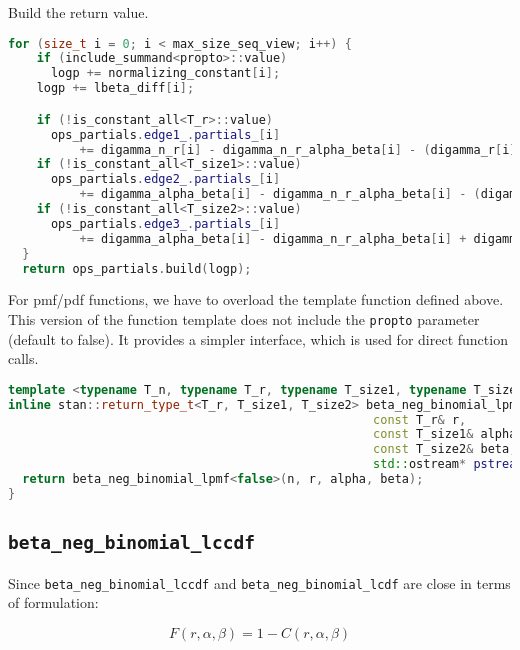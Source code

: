 \documentclass[11pt]{article}
\begin{document}
Build the return value.
\begin{lstlisting}[language=c++, style=lgeneral]
  for (size_t i = 0; i < max_size_seq_view; i++) {
    if (include_summand<propto>::value)
      logp += normalizing_constant[i];
    logp += lbeta_diff[i];

    if (!is_constant_all<T_r>::value)
      ops_partials.edge1_.partials_[i]
          += digamma_n_r[i] - digamma_n_r_alpha_beta[i] - (digamma_r[i] - digamma_r_alpha[i]);
    if (!is_constant_all<T_size1>::value)
      ops_partials.edge2_.partials_[i]
          += digamma_alpha_beta[i] - digamma_n_r_alpha_beta[i] - (digamma_alpha[i] - digamma_r_alpha[i]);
    if (!is_constant_all<T_size2>::value)
      ops_partials.edge3_.partials_[i]
          += digamma_alpha_beta[i] - digamma_n_r_alpha_beta[i] + digamma_n_beta[i] - digamma_beta[i];
  }
  return ops_partials.build(logp);
\end{lstlisting}


For pmf/pdf functions, we have to overload the template function defined above. This version of the function template does not include the \verb|propto| parameter (default to false). It provides a simpler interface, which is used for direct function calls.

\begin{lstlisting}[language=c++, style=lgeneral]
template <typename T_n, typename T_r, typename T_size1, typename T_size2>
inline stan::return_type_t<T_r, T_size1, T_size2> beta_neg_binomial_lpmf(const T_n& n,
                                                   const T_r& r,
                                                   const T_size1& alpha,
                                                   const T_size2& beta,
                                                   std::ostream* pstream__) {
  return beta_neg_binomial_lpmf<false>(n, r, alpha, beta);
}
\end{lstlisting}



\cprotect\subsection{\verb|beta_neg_binomial_lccdf|}

Since \verb|beta_neg_binomial_lccdf| and \verb|beta_neg_binomial_lcdf| are close in terms of formulation:

\begin{equation}
	F(r,\alpha,\beta) = 1 - C(r,\alpha,\beta)
\end{equation}
\end{document}
